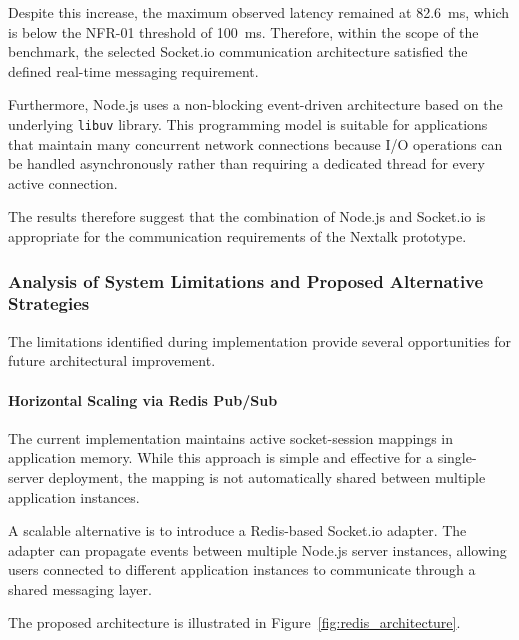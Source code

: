 \documentclass[12pt, a4paper]{article}
\begin{document}
Despite this increase, the maximum observed latency remained at 82.6~ms, which is below the NFR-01 threshold of 100~ms. Therefore, within the scope of the benchmark, the selected Socket.io communication architecture satisfied the defined real-time messaging requirement.

Furthermore, Node.js uses a non-blocking event-driven architecture based on the underlying \texttt{libuv} library. This programming model is suitable for applications that maintain many concurrent network connections because I/O operations can be handled asynchronously rather than requiring a dedicated thread for every active connection.

The results therefore suggest that the combination of Node.js and Socket.io is appropriate for the communication requirements of the Nextalk prototype.

\subsubsection{Analysis of System Limitations and Proposed Alternative Strategies}

The limitations identified during implementation provide several opportunities for future architectural improvement.

\paragraph{Horizontal Scaling via Redis Pub/Sub}

The current implementation maintains active socket-session mappings in application memory. While this approach is simple and effective for a single-server deployment, the mapping is not automatically shared between multiple application instances.

A scalable alternative is to introduce a Redis-based Socket.io adapter. The adapter can propagate events between multiple Node.js server instances, allowing users connected to different application instances to communicate through a shared messaging layer.

The proposed architecture is illustrated in Figure~\ref{fig:redis_architecture}.
\end{document}
